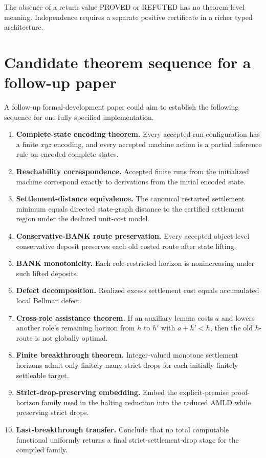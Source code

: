 \documentclass[11pt]{article}
\theoremstyle{remark}
\begin{document}
The absence of a return value PROVED or REFUTED has no theorem-level meaning. Independence requires a separate positive certificate in a richer typed architecture.

\section{Candidate theorem sequence for a follow-up paper}

A follow-up formal-development paper could aim to establish the following sequence for one fully specified implementation.

\begin{enumerate}[label=\textbf{T\arabic*.}]
\item \textbf{Complete-state encoding theorem.} Every accepted run configuration has a finite $xyz$ encoding, and every accepted machine action is a partial inference rule on encoded complete states.
\item \textbf{Reachability correspondence.} Accepted finite runs from the initialized machine correspond exactly to derivations from the initial encoded state.
\item \textbf{Settlement-distance equivalence.} The canonical restarted settlement minimum equals directed state-graph distance to the certified settlement region under the declared unit-cost model.
\item \textbf{Conservative-BANK route preservation.} Every accepted object-level conservative deposit preserves each old costed route after state lifting.
\item \textbf{BANK monotonicity.} Each role-restricted horizon is nonincreasing under such lifted deposits.
\item \textbf{Defect decomposition.} Realized excess settlement cost equals accumulated local Bellman defect.
\item \textbf{Cross-role assistance theorem.} If an auxiliary lemma costs $a$ and lowers another role's remaining horizon from $h$ to $h'$ with $a+h'<h$, then the old $h$-route is not globally optimal.
\item \textbf{Finite breakthrough theorem.} Integer-valued monotone settlement horizons admit only finitely many strict drops for each initially finitely settleable target.
\item \textbf{Strict-drop-preserving embedding.} Embed the explicit-premise proof-horizon family used in the halting reduction into the reduced AMLD while preserving strict drops.
\item \textbf{Last-breakthrough transfer.} Conclude that no total computable functional uniformly returns a final strict-settlement-drop stage for the compiled family.
\end{enumerate}
\end{document}
